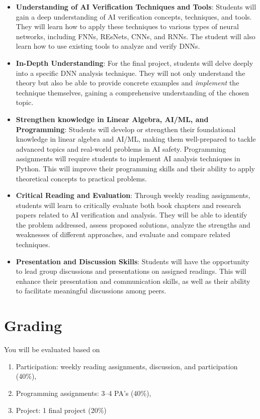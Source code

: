 \documentclass[11pt]{article}
\begin{document}
\begin{itemize}
\item \textbf{Understanding of AI Verification Techniques and Tools}: Students will gain a deep understanding of AI verification concepts, techniques, and tools. They will learn how to apply these techniques to various types of neural networks, including FNNs, REsNets, CNNs, and RNNs.  The student will also learn how to use existing tools to analyze and verify DNNs.

\item \textbf{In-Depth Understanding}: For the final project, students will delve deeply into a specific DNN analysis technique. They will not only understand the theory but also be able to provide concrete examples and \emph{implement} the technique themselves, gaining a comprehensive understanding of the chosen topic.  

\item \textbf{Strengthen knowledge in Linear Algebra, AI/ML, and Programming}: Students will develop or strengthen their foundational knowledge in linear algebra and AI/ML, making them well-prepared to tackle advanced topics and real-world problems in AI safety. 
Programming assignments will require students to implement AI analysis techniques in Python. This will improve their programming skills and their ability to apply theoretical concepts to practical problems.


\item \textbf{Critical Reading and Evaluation}: Through weekly reading assignments, students will learn to critically evaluate both book chapters and research papers related to AI verification and analysis. They will be able to identify the problem addressed, assess proposed solutions, analyze the strengths and weaknesses of different approaches, and evaluate and compare related techniques.

\item \textbf{Presentation and Discussion Skills}: Students will have the opportunity to lead group discussions and presentations on assigned readings. This will enhance their presentation and communication skills, as well as their ability to facilitate meaningful discussions among peers.

\end{itemize}

\section{Grading}
You will be evaluated based on
\begin{enumerate}
\item Participation:  weekly reading assignments, discussion, and participation (40\%),
\item Programming assignments: 3--4 PA's (40\%), 
\item Project: 1 final project  (20\%)
\end{enumerate}
\end{document}
